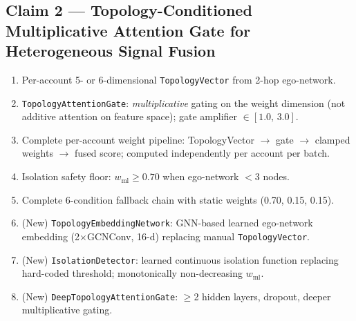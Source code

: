 \documentclass[12pt,a4paper]{article}
\begin{document}
\subsection{Claim 2 --- Topology-Conditioned Multiplicative Attention Gate
            for Heterogeneous Signal Fusion}
\begin{enumerate}[label=2.\arabic*,leftmargin=2.5em,noitemsep]
  \item Per-account 5- or 6-dimensional \texttt{TopologyVector} from 2-hop ego-network.
  \item \texttt{TopologyAttentionGate}: \emph{multiplicative} gating on the weight
        dimension (not additive attention on feature space); gate amplifier
        $\in[1.0,\,3.0]$.
  \item Complete per-account weight pipeline: TopologyVector $\to$ gate $\to$
        clamped weights $\to$ fused score; computed independently per account per batch.
  \item Isolation safety floor: $w_\text{ml}\geq 0.70$ when ego-network $<$3 nodes.
  \item Complete 6-condition fallback chain with static weights (0.70, 0.15, 0.15).
  \item (New) \texttt{TopologyEmbeddingNetwork}: GNN-based learned ego-network embedding
        (2$\times$GCNConv, 16-d) replacing manual \texttt{TopologyVector}.
  \item (New) \texttt{IsolationDetector}: learned continuous isolation function replacing
        hard-coded threshold; monotonically non-decreasing $w_\text{ml}$.
  \item (New) \texttt{DeepTopologyAttentionGate}: $\geq$2 hidden layers, dropout, deeper
        multiplicative gating.
\end{enumerate}
\end{document}
